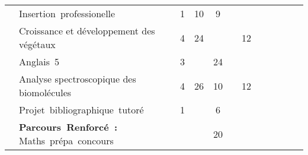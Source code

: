 \begin{tabular}{c|m{4.5cm}|cm{0.75cm}|cm{0.75cm}|cm{0.75cm}|cm{0.75cm}|cm{0.75cm}|}
 & \color{black} \mbox{Insertion professionelle} & \color{black} 1 & \color{black} 10 & \color{black} 9 & & \\ \cline{2-7}

 & \cellcolor{couleurClaire} \color{couleurTexte} Croissance et développement des végétaux & \cellcolor{couleurClaire} \color{couleurTexte} 4 & \cellcolor{couleurClaire} \color{couleurTexte} 24 & \cellcolor{couleurClaire} & \cellcolor{couleurClaire} \color{couleurTexte} &\cellcolor{couleurClaire} \color{couleurTexte} 12 \\ \cline{2-7} 

 & \color{black} \mbox{Anglais 5} & \color{black} 3 & \color{black} & \color{black} 24 &  &  \\ \cline{2-7}

 & \cellcolor{couleurClaire} \color{couleurTexte} Analyse spectroscopique des biomolécules & \cellcolor{couleurClaire} \color{couleurTexte} 4 & \cellcolor{couleurClaire} \color{couleurTexte} 26 & \cellcolor{couleurClaire} \color{couleurTexte} 10 & \cellcolor{couleurClaire} \color{couleurTexte} &\cellcolor{couleurClaire} \color{couleurTexte} 12 \\ \cline{2-7} 

 & \color{black} \mbox{Projet bibliographique tutoré} & \color{black} 1 & \color{black} & \color{black} 6 &  &  \\ \cline{1-7}

 & \cellcolor{couleurClaire} \color{couleurTexte} \mbox{\textbf{Parcours Renforcé :}} \mbox{Maths prépa concours} & \cellcolor{couleurClaire} \color{couleurTexte} & \cellcolor{couleurClaire} \color{couleurTexte} & \cellcolor{couleurClaire} \color{couleurTexte} 20 & \cellcolor{couleurClaire} \color{couleurTexte} &\cellcolor{couleurClaire} \color{couleurTexte} \\ 
\cline{1-7}
\end{tabular}

